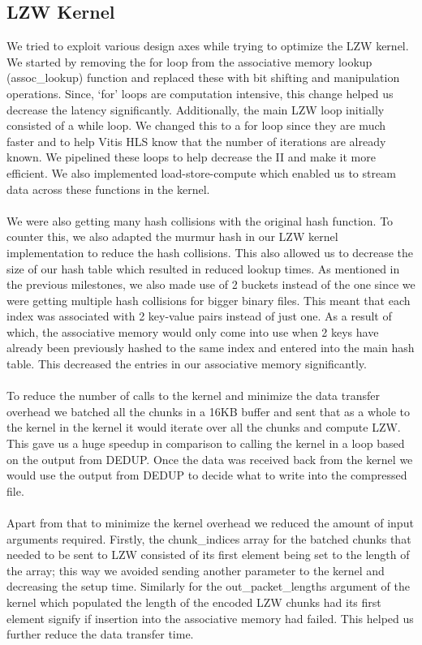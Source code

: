 \documentclass[../main.tex]{subfiles}
\begin{document}
\subsection{\textbf{LZW Kernel}}
We tried to exploit various design axes while trying to optimize the LZW kernel. We started by removing the for loop from the associative memory lookup (assoc\_lookup) function and replaced these with bit shifting and manipulation operations. Since, ‘for’ loops are computation intensive, this change helped us decrease the latency significantly.  Additionally, the main LZW loop initially consisted of a while loop. We changed this to a for loop since they are much faster and to help Vitis HLS know that the number of iterations are already known. We pipelined these loops to help decrease the II and make it more efficient. We also implemented	load-store-compute which enabled us to stream data across these functions in the kernel.\\ \\
We were also getting many hash collisions with the original hash function. To counter this, we also adapted the murmur hash in our LZW kernel implementation to reduce the hash collisions. This also allowed us to decrease the size of our hash table which resulted in reduced lookup times. 
As mentioned in the previous milestones, we also made use of 2 buckets instead of the one since we were getting multiple hash collisions for bigger binary files. This meant that each index was associated with 2 key-value pairs instead of just one. As a result of which, the associative memory would only come into use when 2 keys have already been previously hashed to the same index and entered into the main hash table. This decreased the entries in our associative memory significantly.\\ \\
To reduce the number of calls to the kernel and minimize the data transfer overhead we batched all the chunks in a 16KB buffer and sent that as a whole to the kernel in the kernel it would iterate over all the chunks and compute LZW. This gave us a huge speedup in comparison to calling the kernel in a loop based on the output from DEDUP. Once the data was received back from the kernel we would use the output from DEDUP to decide what to write into the compressed file.\\ \\
Apart from that to minimize the kernel overhead we reduced the amount of input arguments required. Firstly, the chunk\_indices array for the batched chunks that needed to be sent to LZW consisted of its first element being set to the length of the array; this way we avoided sending another parameter to the kernel and decreasing the setup time. Similarly for the out\_packet\_lengths argument of the kernel which populated the length of the encoded LZW chunks had its first element signify if insertion into the associative memory had failed. This helped us further reduce the data transfer time. 
\end{document}
